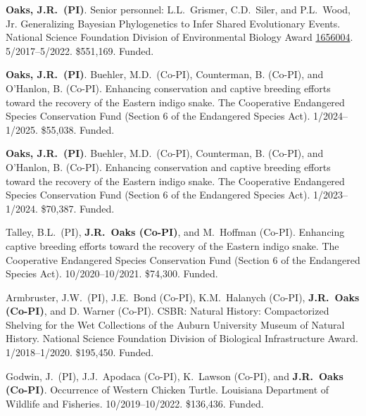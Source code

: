 \myHangIndent
\textbf{Oaks, J.R.\ (PI)}.
Senior personnel: L.L.\ Grismer, C.D.\ Siler, and \postdocsymbol{}P.L.\ Wood, Jr.
Generalizing Bayesian Phylogenetics to Infer Shared Evolutionary Events.
National Science Foundation Division of Environmental Biology Award
\href{https://www.nsf.gov/awardsearch/showAward?AWD_ID=1656004&HistoricalAwards=false}{1656004}.
5/2017--5/2022.
\$551,169.
Funded.

\myHangIndent
\textbf{Oaks, J.R.\ (PI)}.
\phdsymbol{}Buehler, M.D.\ (Co-PI),
Counterman, B. (Co-PI),
and
O'Hanlon, B. (Co-PI).
Enhancing conservation and captive breeding efforts toward the recovery of the Eastern indigo snake.
The Cooperative Endangered Species Conservation Fund (Section 6 of the
Endangered Species Act).
1/2024--1/2025.
\$55,038.
Funded.

\myHangIndent
\textbf{Oaks, J.R.\ (PI)}.
\phdsymbol{}Buehler, M.D.\ (Co-PI),
Counterman, B. (Co-PI),
and
O'Hanlon, B. (Co-PI).
Enhancing conservation and captive breeding efforts toward the recovery of the Eastern indigo snake.
The Cooperative Endangered Species Conservation Fund (Section 6 of the
Endangered Species Act).
1/2023--1/2024.
\$70,387.
Funded.

\myHangIndent
Talley, B.L.\ (PI),
\textbf{J.R.\ Oaks (Co-PI)},
and
M.\ Hoffman (Co-PI).
Enhancing captive breeding efforts toward the recovery of the Eastern indigo snake.
The Cooperative Endangered Species Conservation Fund (Section 6 of the
Endangered Species Act).
10/2020--10/2021.
\$74,300.
Funded.

\myHangIndent
Armbruster, J.W.\ (PI),
J.E.\ Bond (Co-PI),
K.M.\ Halanych (Co-PI),
\textbf{J.R.\ Oaks (Co-PI)},
and
D. Warner (Co-PI).
CSBR: Natural History: Compactorized Shelving for the Wet Collections of the
Auburn University Museum of Natural History.
National Science Foundation Division of Biological Infrastructure Award.
1/2018--1/2020.
\$195,450.
Funded.


\myHangIndent
Godwin, J.\ (PI),
J.J.\ Apodaca (Co-PI),
K.\ Lawson (Co-PI),
and
\textbf{J.R.\ Oaks (Co-PI)}.
Occurrence of Western Chicken Turtle.
Louisiana Department of Wildlife and Fisheries.
10/2019--10/2022.
\$136,436.
Funded.

